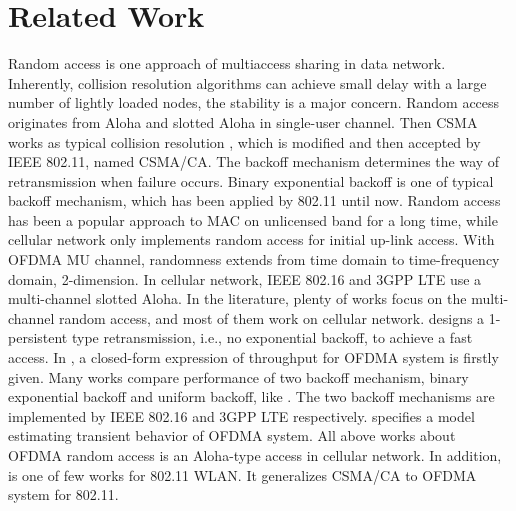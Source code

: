 \section{Related Work}
Random access is one approach of multiaccess sharing in data network.
Inherently, collision resolution algorithms can achieve small delay with a large number of lightly loaded nodes, the stability is a major concern\cite{bertsekas1992data}\cite{chen1994medium}.  
Random access originates from Aloha and slotted Aloha in single-user channel. 
Then CSMA works as typical collision resolution  \cite{kleinrock1975packet}, which is modified and then accepted by IEEE 802.11, named CSMA/CA. 
The backoff mechanism determines the way of retransmission when failure occurs. 
Binary exponential backoff is one of typical backoff mechanism, which has been applied by 802.11 until now.
Random access has been a popular approach to MAC on unlicensed band for a long time, while cellular network  only implements random access for initial up-link access. 
With OFDMA MU channel, randomness extends from time domain to time-frequency domain, 2-dimension. 
In cellular network, IEEE 802.16 and 3GPP LTE use a multi-channel slotted Aloha.
In the literature, plenty of works focus on the multi-channel random access, and most of them work on cellular network.
\cite{choi2006multichannel} designs a 1-persistent type retransmission, i.e., no exponential backoff, to achieve a fast access.  
In \cite{zhou2008efficient}, a closed-form expression of throughput for OFDMA system is firstly given.
Many works compare performance of two backoff mechanism, binary exponential backoff and uniform backoff, like \cite{zhou2008efficient} \cite{seo2011design} \cite{kim2012performance}.
The two backoff mechanisms are implemented by IEEE 802.16 and 3GPP LTE respectively.  \cite{wei2015modeling} specifies a model estimating transient behavior of OFDMA system.
All above works about OFDMA random access is an Aloha-type access in cellular network.
In addition, \cite{GeneralizedOFDMACSMACA} is one of few works for 802.11 WLAN. 
It generalizes CSMA/CA to OFDMA system for 802.11.




